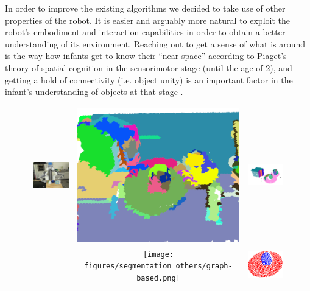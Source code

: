 In order to improve the existing algorithms we decided to take use of other properties of the robot. It is easier and arguably more natural to exploit the robot's embodiment
and interaction capabilities in order to obtain a better understanding of its environment.
Reaching out to get a sense of what is around is the way how infants get to know their
``near space'' according to Piaget's theory of spatial cognition in the sensorimotor stage 
(until the age of 2), and getting a hold of connectivity (i.e. object unity) is an important
factor in the infant's understanding of objects at that stage \cite{infants}.


\setlength{\tabcolsep}{0.1em}
\begin{figure}[ht]
\begin{tabular}{cccc}
\multicolumn{2}{c}{\multirow{-6}{*}{\includegraphics[width=0.5\columnwidth]{figures/teaser/IMG_0395.JPG}
}} & \includegraphics[width=0.23\columnwidth]{figures/segmentation_others/region_growing_rgb.png} 
&\includegraphics[width=0.23\columnwidth]{figures/segmentation_others/part-graph-hashing.png} \\
\multicolumn{2}{c}{} & \texttt{[image: figures/segmentation\_others/graph-based.png]} 
&\includegraphics[width=0.23\columnwidth]{pictures/teaser_egg_result-cropped.png} \\

\end{tabular}
\end{figure}
